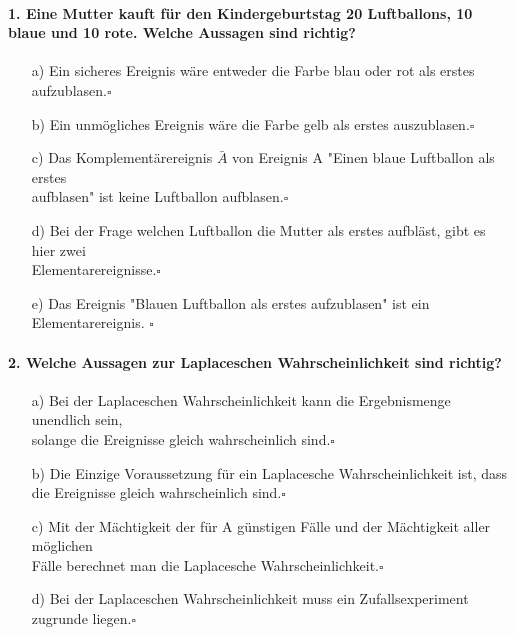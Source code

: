 \documentclass[a4paper]{article}
\begin{document}
\paragraph{1. Eine Mutter kauft für den Kindergeburtstag 20 Luftballons, 10 blaue und 10 rote. Welche Aussagen sind richtig?}
\begin{itemize}
    \item[a)] Ein sicheres Ereignis wäre entweder die Farbe blau oder rot als erstes aufzublasen.\hfill $\square$
    \item[b)]Ein unmögliches Ereignis wäre die Farbe gelb als erstes auszublasen.\hfill $\square$
    \item[c)]Das Komplementärereignis $\bar A$ von Ereignis A "Einen blaue Luftballon als erstes \\aufblasen" ist keine Luftballon aufblasen.\hfill $\square$
    \item[d)]Bei der Frage welchen Luftballon die Mutter als erstes aufbläst, gibt es hier zwei\\ Elementarereignisse.\hfill $\square$
    \item[e)]Das Ereignis "Blauen Luftballon als erstes aufzublasen" ist ein Elementarereignis. \hfill $\square$
\end{itemize}

\paragraph{2. Welche Aussagen zur Laplaceschen Wahrscheinlichkeit sind richtig?}
\begin{itemize}
    \item [a)] Bei der Laplaceschen Wahrscheinlichkeit kann die Ergebnismenge unendlich sein,\\ solange die Ereignisse gleich wahrscheinlich sind.\hfill $\square$
    \item[b)] Die Einzige Voraussetzung für ein Laplacesche Wahrscheinlichkeit ist, dass \\die Ereignisse gleich wahrscheinlich sind.\hfill $\square$
    \item[c)]Mit der Mächtigkeit der für A günstigen Fälle und der Mächtigkeit aller möglichen\\ Fälle berechnet man die Laplacesche Wahrscheinlichkeit.\hfill $\square$
    \item[d)]Bei der Laplaceschen Wahrscheinlichkeit muss ein Zufallsexperiment zugrunde liegen.\hfill $\square$
\end{itemize}
\end{document}
